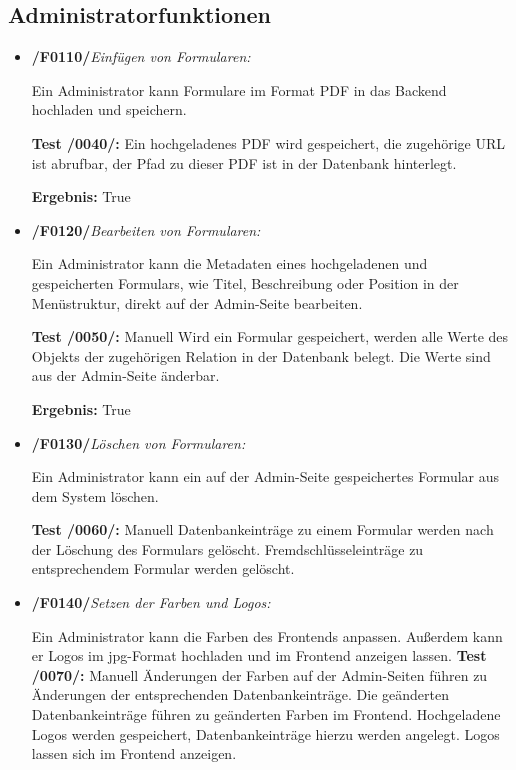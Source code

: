 \subsection{Administratorfunktionen}

    \begin{itemize}
        \item \textbf{/F0110/}\textit{Einfügen von Formularen:} \par
        Ein Administrator kann Formulare im Format PDF in das Backend hochladen und speichern.\par
        \noindent \textbf{Test /0040/:} Ein hochgeladenes PDF wird gespeichert, die zugehörige URL ist abrufbar, der Pfad zu dieser PDF ist in der Datenbank hinterlegt.\par
        \noindent \textbf{Ergebnis:} True
        
        \item \textbf{/F0120/}\textit{Bearbeiten von Formularen:} \par
        Ein Administrator kann die Metadaten eines hochgeladenen und gespeicherten Formulars, wie Titel, Beschreibung oder Position in der Menüstruktur, direkt auf der Admin-Seite bearbeiten.\par
        \noindent \textbf{Test /0050/:} Manuell Wird ein Formular gespeichert, werden alle Werte des Objekts der zugehörigen Relation in der Datenbank belegt. Die Werte sind aus der Admin-Seite änderbar.\par
        \noindent \textbf{Ergebnis:} True
        
        \item \textbf{/F0130/}\textit{Löschen von Formularen:} \par
        Ein Administrator kann ein auf der Admin-Seite gespeichertes Formular aus dem System löschen.\par
        \noindent \textbf{Test /0060/:} Manuell Datenbankeinträge zu einem Formular werden nach der Löschung des Formulars gelöscht. Fremdschlüsseleinträge zu entsprechendem Formular werden gelöscht.\par
        
        \item \textbf{/F0140/}\textit{Setzen der Farben und Logos:} \par 
        Ein Administrator kann die Farben des Frontends anpassen. Außerdem kann er Logos im jpg-Format hochladen und im Frontend anzeigen lassen.
        \newpage
        \noindent \textbf{Test /0070/:} Manuell Änderungen der Farben auf der Admin-Seiten führen zu Änderungen der entsprechenden Datenbankeinträge. Die geänderten Datenbankeinträge führen zu geänderten Farben im Frontend. Hochgeladene Logos werden gespeichert, Datenbankeinträge hierzu werden angelegt. Logos lassen sich im Frontend anzeigen.\par
        

\end{itemize}
